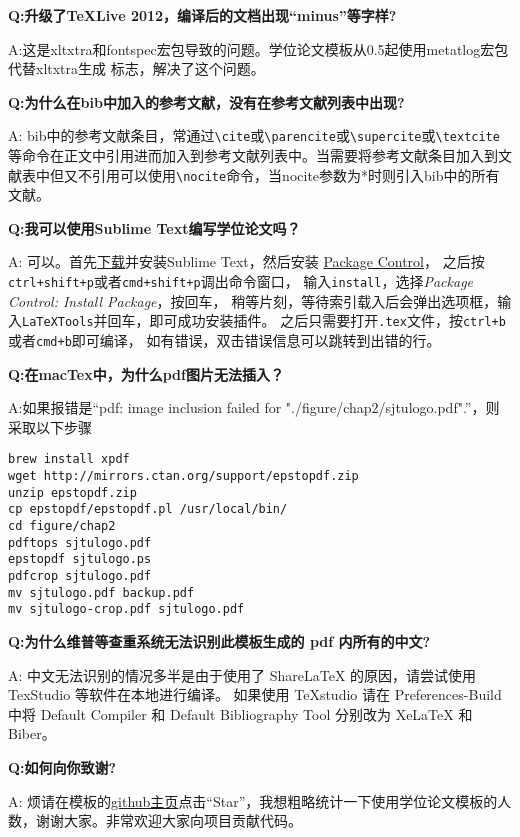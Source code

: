 {\bfseries{}Q:升级了TeXLive 2012，编译后的文档出现“minus”等字样?}

A:这是xltxtra和fontspec宏包导致的问题。学位论文模板从0.5起使用metatlog宏包代替xltxtra生成 \XeTeX 标志，解决了这个问题。

{\bfseries{}Q:为什么在bib中加入的参考文献，没有在参考文献列表中出现?}

A: bib中的参考文献条目，常通过\verb+\cite+或\verb+\parencite+或\verb+\supercite+或\verb+\textcite+等命令在正文中引用进而加入到参考文献列表中。当需要将参考文献条目加入到文献表中但又不引用可以使用\verb+\nocite+命令，当nocite参数为*时则引入bib中的所有文献。

{\bfseries{}Q:我可以使用Sublime Text编写学位论文吗？}

A: 可以。首先\href{https://www.sublimetext.com/}{下载}并安装Sublime Text，然后安装
\href{https://packagecontrol.io/installation}{Package Control}，
之后按\verb|ctrl+shift+p|或者\verb|cmd+shift+p|调出命令窗口，
输入\verb|install|，选择\textit{Package Control: Install Package}，按回车，
稍等片刻，等待索引载入后会弹出选项框，输入\verb|LaTeXTools|并回车，即可成功安装插件。
之后只需要打开\verb|.tex|文件，按\verb|ctrl+b|或者\verb|cmd+b|即可编译，
如有错误，双击错误信息可以跳转到出错的行。

{\bfseries{}Q:在macTex中，为什么pdf图片无法插入？}

A:如果报错是“pdf: image inclusion failed for "./figure/chap2/sjtulogo.pdf".”，则采取以下步骤

\begin{lstlisting}[basicstyle=\small\ttfamily, caption={编译模板}, numbers=none]
brew install xpdf
wget http://mirrors.ctan.org/support/epstopdf.zip
unzip epstopdf.zip
cp epstopdf/epstopdf.pl /usr/local/bin/
cd figure/chap2
pdftops sjtulogo.pdf
epstopdf sjtulogo.ps
pdfcrop sjtulogo.pdf
mv sjtulogo.pdf backup.pdf
mv sjtulogo-crop.pdf sjtulogo.pdf
\end{lstlisting}

{\bfseries{}Q:为什么维普等查重系统无法识别此模板生成的 pdf 内所有的中文?}

A: 中文无法识别的情况多半是由于使用了 ShareLaTeX 的原因，请尝试使用 TexStudio 等软件在本地进行编译。
如果使用 TeXstudio 请在 Preferences-Build 中将 Default Compiler 和 Default Bibliography Tool 分别改为 XeLaTeX 和 Biber。

{\bfseries{}Q:如何向你致谢?}

A: 烦请在模板的\href{https://github.com/sjtug/SJTUThesis}{github主页}点击“Star”，我想粗略统计一下使用学位论文模板的人数，谢谢大家。非常欢迎大家向项目贡献代码。
